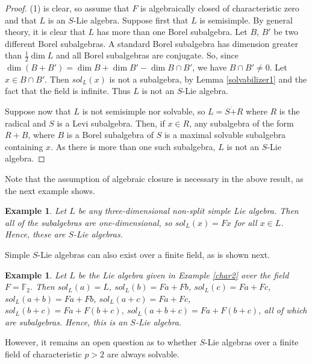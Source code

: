 \documentclass[11pt]{amsart}
\theoremstyle{plain}
\newtheorem{proposition}[theorem]{Proposition}
\newtheorem{example}[theorem]{Example}
\def\F{\mathbb{F}}
\begin{document}
\begin{proof}
(1) is clear, so assume that $F$ is algebraically closed of characteristic zero and that $L$ is an $S$-Lie algebra. Suppose first that $L$ is semisimple. By general theory, it is clear that $L$ has more than one Borel subalgebra. Let $B$, $B'$ be two different Borel subalgebras. A standard Borel subalgebra has dimension greater than $\frac{1}{2}\dim L$ and all Borel subalgebras are conjugate. So, since $ \dim (B+B')=\dim B+\dim B'-\dim B\cap B'$, we have $B\cap B'\neq 0$. Let $x\in B\cap B'$. Then $sol_L(x)$ is not a subalgebra, by Lemma \ref{solvabilizer1} and the fact that the field is infinite. Thus $L$ is not an $S$-Lie algebra.
\par

Suppose now that $L$ is not semisimple nor solvable, so $L=S\dot{+} R$ where $R$ is the radical and $S$ is a Levi subalgebra. Then, if $x\in R$, any subalgebra of the form $R+B$, where $B$ is a Borel subalgebra of $S$ is a maximal solvable subalgebra containing $x$. As there is more than one such subalgebra, $L$ is not an $S$-Lie algebra. 
\end{proof}

Note that the assumption of algebraic closure is necessary in the above result, as the next example shows.

\begin{example}  Let $L$ be any three-dimensional non-split simple Lie algebra. Then all of the subalgebras are one-dimensional, so $sol_L(x) = Fx$ for all $x \in L$. Hence, these are $S$-Lie algebras.
\end{example}

Simple $S$-Lie algebras can also exist over a finite field, as is shown next.

\begin{example}
Let $L$ be the Lie algebra given in Example \ref{char2} over the field $F=\F_2$. Then  $sol_L(a) = L$, $sol_L(b) = Fa + Fb$, $sol_L(c) = Fa + Fc$, $sol_L(a+b) = Fa + Fb$, $sol_L(a+c) = Fa + Fc$, $sol_L(b+c) = Fa + F(b+c)$, $sol_L(a+b+c) = Fa + F(b+c)$, all of which are subalgebras. Hence, this is an $S$-Lie algebra.
\end{example}

However, it remains an open question as to whether $S$-Lie algebras over a finite field of characteristic $p>2$ are always solvable.

\end{document}

